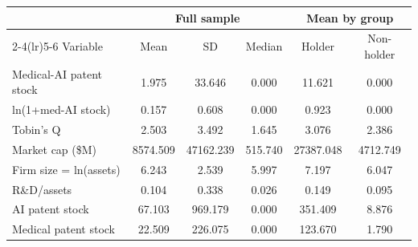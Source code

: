 \begin{tabular}{lccccc}
\toprule
& \multicolumn{3}{c}{Full sample} & \multicolumn{2}{c}{Mean by group} \\
\cmidrule(lr){2-4}\cmidrule(lr){5-6}
Variable & Mean & SD & Median & Holder & Non-holder \\
\midrule
Medical-AI patent stock & 1.975 & 33.646 & 0.000 & 11.621 & 0.000 \\
ln(1+med-AI stock) & 0.157 & 0.608 & 0.000 & 0.923 & 0.000 \\
Tobin's Q & 2.503 & 3.492 & 1.645 & 3.076 & 2.386 \\
Market cap (\$M) & 8574.509 & 47162.239 & 515.740 & 27387.048 & 4712.749 \\
Firm size = ln(assets) & 6.243 & 2.539 & 5.997 & 7.197 & 6.047 \\
R\&D/assets & 0.104 & 0.338 & 0.026 & 0.149 & 0.095 \\
AI patent stock & 67.103 & 969.179 & 0.000 & 351.409 & 8.876 \\
Medical patent stock & 22.509 & 226.075 & 0.000 & 123.670 & 1.790 \\
\bottomrule
\end{tabular}